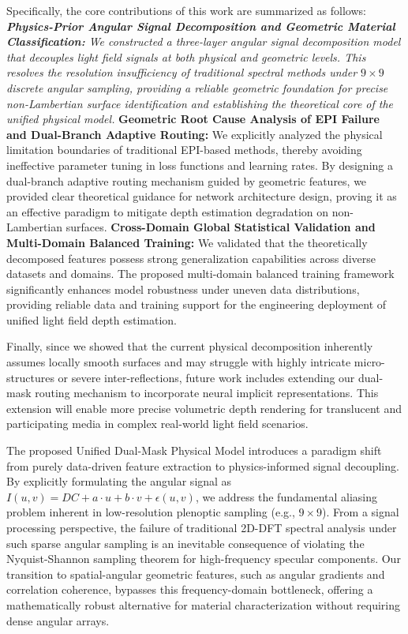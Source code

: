 \documentclass[lettersize,journal]{IEEEtran}
\begin{document}
Specifically, the core contributions of this work are summarized as follows:
\textit{ \textbf{Physics-Prior Angular Signal Decomposition and Geometric Material Classification:} We constructed a three-layer angular signal decomposition model that decouples light field signals at both physical and geometric levels. This resolves the resolution insufficiency of traditional spectral methods under $9 \times 9$ discrete angular sampling, providing a reliable geometric foundation for precise non-Lambertian surface identification and establishing the theoretical core of the unified physical model.
} \textbf{Geometric Root Cause Analysis of EPI Failure and Dual-Branch Adaptive Routing:} We explicitly analyzed the physical limitation boundaries of traditional EPI-based methods, thereby avoiding ineffective parameter tuning in loss functions and learning rates. By designing a dual-branch adaptive routing mechanism guided by geometric features, we provided clear theoretical guidance for network architecture design, proving it as an effective paradigm to mitigate depth estimation degradation on non-Lambertian surfaces.
\textbf{Cross-Domain Global Statistical Validation and Multi-Domain Balanced Training:} We validated that the theoretically decomposed features possess strong generalization capabilities across diverse datasets and domains. The proposed multi-domain balanced training framework significantly enhances model robustness under uneven data distributions, providing reliable data and training support for the engineering deployment of unified light field depth estimation.

Finally, since we showed that the current physical decomposition inherently assumes locally smooth surfaces and may struggle with highly intricate micro-structures or severe inter-reflections, future work includes extending our dual-mask routing mechanism to incorporate neural implicit representations. This extension will enable more precise volumetric depth rendering for translucent and participating media in complex real-world light field scenarios.


The proposed Unified Dual-Mask Physical Model introduces a paradigm shift from purely data-driven feature extraction to physics-informed signal decoupling. By explicitly formulating the angular signal as $I(u,v) = DC + a\cdot u + b\cdot v + \epsilon(u,v)$, we address the fundamental aliasing problem inherent in low-resolution plenoptic sampling (e.g., $9 \times 9$). From a signal processing perspective, the failure of traditional 2D-DFT spectral analysis under such sparse angular sampling is an inevitable consequence of violating the Nyquist-Shannon sampling theorem for high-frequency specular components. Our transition to spatial-angular geometric features, such as angular gradients and correlation coherence, bypasses this frequency-domain bottleneck, offering a mathematically robust alternative for material characterization without requiring dense angular arrays.
\end{document}
